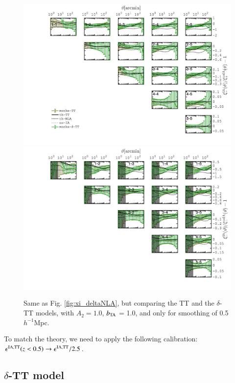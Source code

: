 \documentclass[useAMS,usenatbib]{mn2e}
\begin{document}
\begin{figure}
\includegraphics[width=\columnwidth]{graphs/frac_xip_IA1_skysim_deltaTT_srd.jpg}
\includegraphics[width=\columnwidth]{graphs/frac_xim_IA1_skysim_deltaTT_srd.jpg}
\caption{Same as Fig. \ref{fig:xi_deltaNLA}, but comparing the TT and the $\delta$-TT models, with $A_2=1.0$, $b_{\rm TA}$ = 1.0, and only for smoothing of 0.5$h^{-1}$Mpc. }
\label{fig:xi_deltaTT}
\end{figure}



To match the theory, we need to apply the following calibration: $\epsilon^{\rm IA, TT}(z<0.5) \rightarrow \epsilon^{\rm IA, TT} /2.5$.

\subsection{$\delta$-TT model}
\label{subsec:TT}
\end{document}
